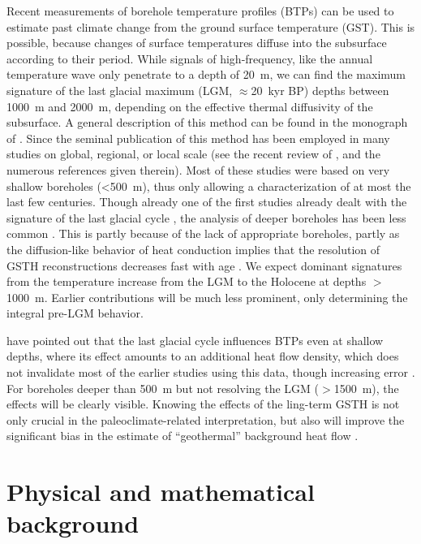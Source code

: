 \documentclass[cp]{copernicus}
\begin{document}
\introduction 
\label{sec:intro}
Recent measurements of borehole temperature profiles (BTPs) can be used to estimate past climate 
change from the ground surface temperature (GST). This is possible, because changes of surface 
temperatures diffuse into the sub­surface according to their period. While signals of 
high-frequency, like the annual temperature wave only pene­trate to a depth of 20~m, we can find 
the 
maximum signature of the last glacial maximum (LGM, $\approx$20~kyr BP) depths between 1000~m and 
2000~m, depending on the effective thermal diffusivity of the subsurface. A general de­scription of 
this method can be found in the monograph of \citet{Bodri2007a}. Since the seminal publi­cation of 
\citet{Lachenbruch1986a} this method has been employed in many studies on global, regional, or 
local 
scale (see the recent review of \citet{Gonzalez-Rouco2009a}, and the numerous references given 
therein). Most of these studies were based on very shallow boreholes (<500~m), thus only allowing a 
characterization of at most the last few centuries. Though already one of the first studies already 
dealt with the signature of the last glacial cycle \citep{Hotchkiss1934a}, the analysis of deeper 
boreholes has been less common 
\citep{Demezhko2014a, Kukkonen2011a, Kukkonen2011b, Chouinard2009a, Majorowicz2008a, Rath2007a,
Mottaghy2006a, Demezhko2001a, Clauser1995c}. This is partly because of the lack of appropriate 
boreholes, partly 
as the diffusion-like behavior of heat conduction implies that the resolution of GSTH 
reconstructions decreases fast with age \cite[e.g.][]{Demezhko2001a}. We expect dominant signatures 
from the temperature increase from the LGM to the Holocene at depths $>$1000~m. Earlier 
contributions will be much less prominent, only determining the integral pre-LGM behavior. 

\citet{Rath2012a} have pointed out that the last glacial cycle influences BTPs even at shallow 
depths, where its effect amounts to an additional heat flow density, which does not invalidate most 
of the earlier studies using this data, though increasing error \citep{Beltrami2011a, Rath2012a}. 
For boreholes deeper than 500~m but not resolving the LGM ($>$1500~m), the effects will be clearly 
visible. Knowing the effects of the ling-term GSTH is not only crucial in the paleoclimate-related 
interpretation, but also will improve the significant bias in the estimate of ``geothermal'' 
background heat­ flow \cite[e.g.][]{Westaway2013a,Majorowicz2011a,Slagstad2009a}. 


\section{Physical and mathematical background}
\end{document}
